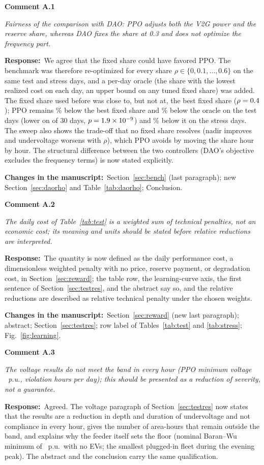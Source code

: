 \documentclass[10pt,a4paper]{article}
\newcommand{\rc}[1]{\par\noindent\textbf{Comment #1}\par}
\newcommand{\resp}{\par\noindent\textbf{Response:}\ }
\newcommand{\chg}{\par\noindent\textbf{Changes in the manuscript:}\ }
\begin{document}
\rc{A.1} \emph{Fairness of the comparison with DAO: PPO adjusts both
the V2G power and the reserve share, whereas DAO fixes the share at
0.3 and does not optimize the frequency part.}

\resp We agree that the fixed share could have favored PPO. The
benchmark was therefore re-optimized for every share
$\rho\in\{0,0.1,\dots,0.6\}$ on the same test and stress days, and a
per-day oracle (the share with the lowest realized cost on each day,
an upper bound on any tuned fixed share) was added. The fixed share
used before was close to, but not at, the best fixed share
($\rho=0.4$); PPO remains \RedCostDaoRhoBest\% below the best
fixed share and \RedCostDaoOracle\% below the oracle on the test days
(lower on \WinsDaoOracle{} of 30 days, $p=1.9\times10^{-9}$) and
\RedCostDaoOracleS\% below it on the stress days. The sweep also shows
the trade-off that no fixed share resolves (nadir improves and
undervoltage worsens with $\rho$), which PPO avoids by moving the share
hour by hour. The structural difference between the two controllers
(DAO's objective excludes the frequency terms) is now stated
explicitly.

\chg Section~\ref{sec:bench} (last paragraph); new
Section~\ref{sec:daorho} and Table~\ref{tab:daorho}; Conclusion.

\rc{A.2} \emph{The daily cost of Table~\ref{tab:test} is a weighted sum
of technical penalties, not an economic cost; its meaning and units
should be stated before relative reductions are interpreted.}

\resp The quantity is now defined as the daily performance cost, a
dimensionless weighted penalty with no price, reserve payment, or
degradation cost, in Section~\ref{sec:reward}; the table row, the
learning-curve axis, the first sentence of
Section~\ref{sec:testres}, and the abstract say so, and the relative
reductions are described as relative technical penalty under the
chosen weights.

\chg Section~\ref{sec:reward} (new last paragraph); abstract;
Section~\ref{sec:testres}; row label of Tables~\ref{tab:test} and
\ref{tab:stress}; Fig.~\ref{fig:learning}.

\rc{A.3} \emph{The voltage results do not meet the band in every hour
(PPO minimum voltage \TPPOVminDay~p.u., \TPPOViolHours{} violation hours
per day); this should be presented as a reduction of severity, not a
guarantee.}

\resp Agreed. The voltage paragraph of Section~\ref{sec:testres} now
states that the results are a reduction in depth and duration of
undervoltage and not compliance in every hour, gives the number of
area-hours that remain outside the band, and explains why the feeder
itself sets the floor (nominal Baran--Wu minimum of \ValVmin~p.u.\
with no EVs; the smallest plugged-in fleet during the evening peak).
The abstract and the conclusion carry the same qualification.
\end{document}
